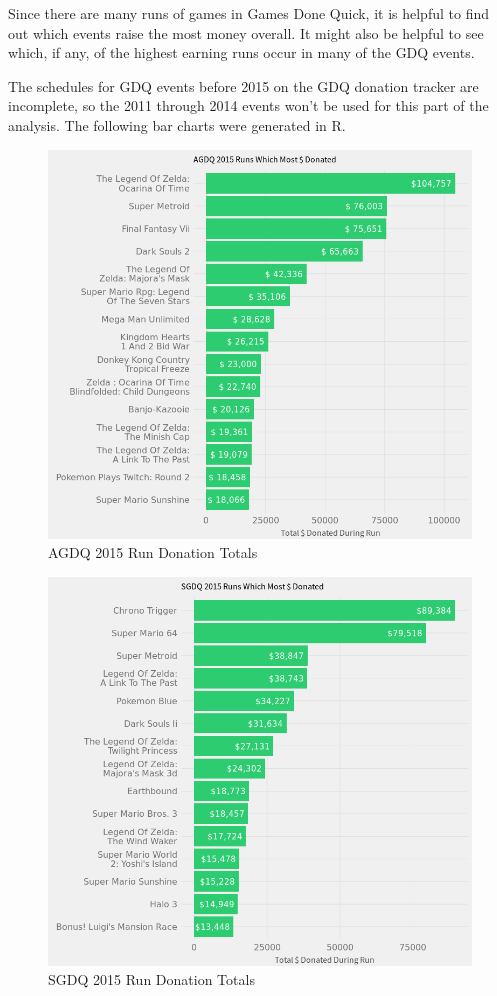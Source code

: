 \documentclass[journal]{IEEEtran}
\begin{document}
Since there are many runs of games in Games Done Quick, it is helpful to find out which events raise the most money overall. It might also be helpful to see which, if any, of the highest earning runs occur in many of the GDQ events.

The schedules for GDQ events before 2015 on the GDQ donation tracker are incomplete, so the 2011 through 2014 events won't be used for this part of the analysis. The following bar charts were generated in R.

\begin{figure}
	\centering
	\includegraphics[scale=0.4]{A2015Runs}
	\caption{AGDQ 2015 Run Donation Totals}
\end{figure}

\begin{figure}
	\centering
	\includegraphics[scale=0.4]{S2015Runs}
	\caption{SGDQ 2015 Run Donation Totals}
\end{figure}
\end{document}
